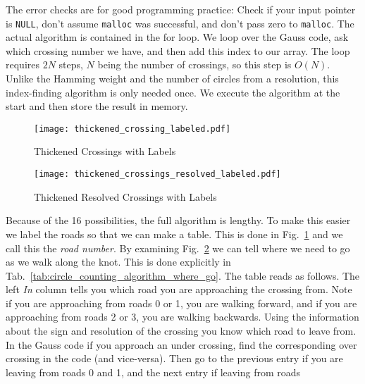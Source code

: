         The error checks are for good programming practice: Check if your
        input pointer is \texttt{NULL}, don't assume \texttt{malloc} was
        successful, and don't pass zero to \texttt{malloc}. The actual algorithm
        is contained in the for loop. We loop over the Gauss code, ask which
        crossing number we have, and then add this index to our array. The
        loop requires $2N$ steps, $N$ being the number of crossings, so this
        step is $O(N)$. Unlike the Hamming weight and the number of circles
        from a resolution, this index-finding algorithm is only needed once. We
        execute the algorithm at the start and then store the result in
        memory.
        \begin{figure}
            \centering
            \texttt{[image: thickened\_crossing\_labeled.pdf]}
            \caption{Thickened Crossings with Labels}
            \label{fig:thickened_crossings_labeled}
        \end{figure}
        \begin{figure}
            \centering
            \texttt{[image: thickened\_crossings\_resolved\_labeled.pdf]}
            \caption{Thickened Resolved Crossings with Labels}
            \label{fig:thickened_crossings_resolved_labeled}
        \end{figure}
        \par\hfill\par
        Because of the 16 possibilities, the full algorithm is lengthy. To make
        this easier we label the roads so that we can make a table. This is
        done in Fig.~\ref{fig:thickened_crossings_labeled} and we call this the
        \textit{road number}. By examining
        Fig.~\ref{fig:thickened_crossings_resolved_labeled} we can tell where
        we need to go as we walk along the knot. This is done explicitly in
        Tab.~\ref{tab:circle_counting_algorithm_where_go}.
        The table reads as follows.
        The left \textit{In} column tells you which road you are approaching the
        crossing from. Note if you are approaching from roads 0 or 1, you are
        walking forward, and if you are approaching from roads 2 or 3, you are
        walking backwards. Using the information about the sign and resolution
        of the crossing you know which road to leave from. In the Gauss code
        if you approach an under crossing, find the corresponding over crossing
        in the code (and vice-versa). Then go to the previous entry if you are
        leaving from roads 0 and 1, and the next entry if leaving from roads
